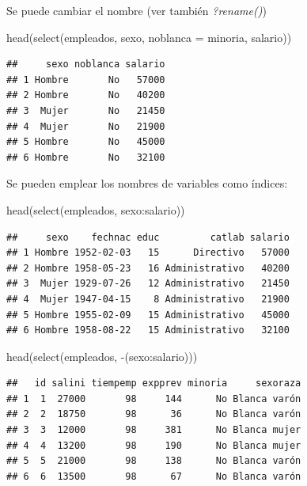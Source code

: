 \documentclass[
]{book}
\newenvironment{Shaded}{\begin{snugshade}}{\end{snugshade}}
\newcommand{\AttributeTok}[1]{\textcolor[rgb]{0.77,0.63,0.00}{#1}}
\newcommand{\FunctionTok}[1]{\textcolor[rgb]{0.00,0.00,0.00}{#1}}
\newcommand{\NormalTok}[1]{#1}
\newcommand{\SpecialCharTok}[1]{\textcolor[rgb]{0.00,0.00,0.00}{#1}}
\theoremstyle{break}
\begin{document}
Se puede cambiar el nombre (ver también \emph{?rename()})

\begin{Shaded}
\begin{Highlighting}[]
\FunctionTok{head}\NormalTok{(}\FunctionTok{select}\NormalTok{(empleados, sexo, }\AttributeTok{noblanca =}\NormalTok{ minoria, salario))}
\end{Highlighting}
\end{Shaded}

\begin{verbatim}
##     sexo noblanca salario
## 1 Hombre       No   57000
## 2 Hombre       No   40200
## 3  Mujer       No   21450
## 4  Mujer       No   21900
## 5 Hombre       No   45000
## 6 Hombre       No   32100
\end{verbatim}

Se pueden emplear los nombres de variables como índices:

\begin{Shaded}
\begin{Highlighting}[]
\FunctionTok{head}\NormalTok{(}\FunctionTok{select}\NormalTok{(empleados, sexo}\SpecialCharTok{:}\NormalTok{salario))}
\end{Highlighting}
\end{Shaded}

\begin{verbatim}
##     sexo    fechnac educ         catlab salario
## 1 Hombre 1952-02-03   15      Directivo   57000
## 2 Hombre 1958-05-23   16 Administrativo   40200
## 3  Mujer 1929-07-26   12 Administrativo   21450
## 4  Mujer 1947-04-15    8 Administrativo   21900
## 5 Hombre 1955-02-09   15 Administrativo   45000
## 6 Hombre 1958-08-22   15 Administrativo   32100
\end{verbatim}

\begin{Shaded}
\begin{Highlighting}[]
\FunctionTok{head}\NormalTok{(}\FunctionTok{select}\NormalTok{(empleados, }\SpecialCharTok{{-}}\NormalTok{(sexo}\SpecialCharTok{:}\NormalTok{salario)))}
\end{Highlighting}
\end{Shaded}

\begin{verbatim}
##   id salini tiempemp expprev minoria     sexoraza
## 1  1  27000       98     144      No Blanca varón
## 2  2  18750       98      36      No Blanca varón
## 3  3  12000       98     381      No Blanca mujer
## 4  4  13200       98     190      No Blanca mujer
## 5  5  21000       98     138      No Blanca varón
## 6  6  13500       98      67      No Blanca varón
\end{verbatim}
\end{document}

